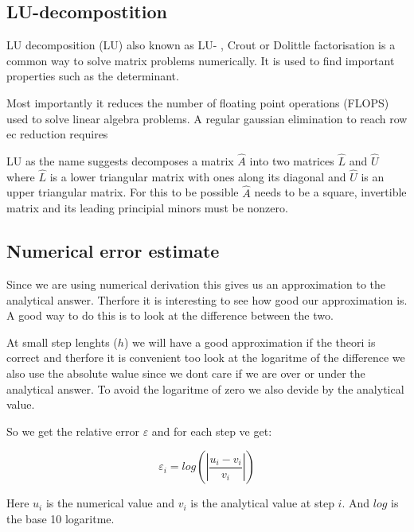 \documentclass[twoside,twocolumn]{article}
\newcommand{\nl}{

\medskip
\noindent
}
\begin{document}
\subsection{LU-decompostition}
LU decomposition (LU) also known as LU- , Crout or Dolittle factorisation \cite{linalg:lay}\cite{compfys} is a common way to solve matrix problems numerically. It is used to find important properties such as the determinant.
\nl
Most importantly it reduces the number of floating point operations (FLOPS) used to solve linear algebra problems.
A regular gaussian elimination to reach row ec reduction requires 
\nl
LU as the name suggests decomposes a matrix $\hat{A}$ into  two matrices $\hat{L}$ and $\hat{U}$ where $\hat{L}$ is a lower triangular matrix with ones along its diagonal and $\hat{U}$ is an upper triangular matrix. For this to be possible $\hat{A}$ needs to be a square, invertible matrix and its leading principial minors must be nonzero.

\subsection{Numerical error estimate}

Since we are using numerical derivation this gives us an approximation to the analytical answer.
Therfore it is interesting to see how good our approximation is.    
A good way to do this is to look at the difference between the two.
\nl
At small step lenghts ($h$) we will have a good approximation if the theori is correct and therfore it is convenient too look at the logaritme of the difference we also use the absolute walue since we dont care if we are over or under the analytical answer. To avoid the logaritme of zero we also devide by the analytical value.
\nl
So we get the relative error $\varepsilon$ and for each step ve get:

\begin{equation}
\varepsilon_i = log\left(\left|\frac{u_i - v_i}{v_i}\right|\right)
\end{equation}

Here $u_i$ is the numerical value and $v_i$ is the analytical value at step $i$. And $log$ is the base 10 logaritme.
\end{document}

